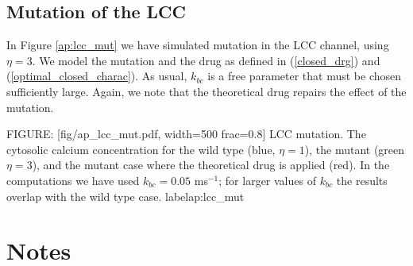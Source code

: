 \subsection{Mutation of the LCC}

In Figure \ref{ap:lcc_mut} we have simulated mutation in the LCC channel, using $\eta=3$.
We model the mutation and the drug as defined in (\ref{closed_drg}) and (\ref{optimal_closed_charac}). As usual, $k_{bc}$ is a free parameter that must be chosen sufficiently large. Again, we note that the theoretical drug repairs the effect of the mutation.

FIGURE: [fig/ap_lcc_mut.pdf, width=500 frac=0.8] LCC mutation. The cytosolic calcium concentration for the wild type (blue, $\eta=1$), the mutant (green $\eta=3$), and the mutant case where the theoretical drug is applied (red). In the computations we have used $k_{bc}=0.05$ ms$^{-1}$; for larger values of $k_{bc}$ the results overlap with the wild type case. label{ap:lcc_mut}


\section{Notes}

